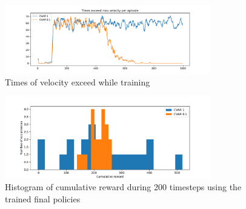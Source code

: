 \begin{figure}[ht]
    \centering
    \includegraphics[width=0.8\textwidth]{images/Cheetah_offpolicy_medium/times_exceedvel.pdf}
    \caption{Times of velocity exceed while training}
    \label{vel_exceed_cheetah}

\end{figure}

\begin{figure}[ht]
    \centering
    \includegraphics[width=0.8\textwidth]{images/Cheetah_offpolicy_medium/hist_evaluation_numevalsteps200.pdf}
    \caption{Histogram of cumulative reward during 200 timesteps using the trained final policies}
    \label{hist_cum_rewards200steps_cheetah}

\end{figure}
